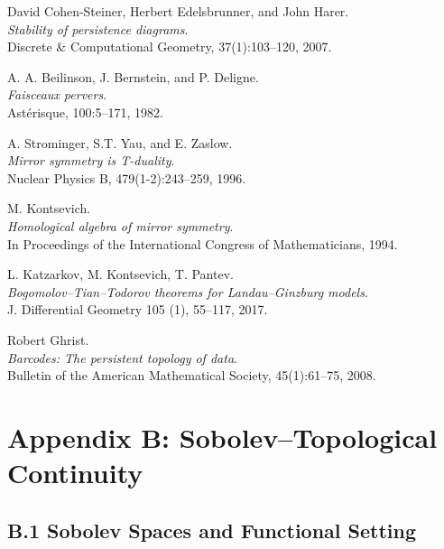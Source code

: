 \documentclass[11pt]{article}
\begin{document}
\begin{thebibliography}{9}

David Cohen-Steiner, Herbert Edelsbrunner, and John Harer.\\
\textit{Stability of persistence diagrams}.\\
Discrete \& Computational Geometry, 37(1):103--120, 2007.

A. A. Beilinson, J. Bernstein, and P. Deligne.\\
\textit{Faisceaux pervers}.\\
Ast\'erisque, 100:5–171, 1982.

A. Strominger, S.T. Yau, and E. Zaslow.\\
\textit{Mirror symmetry is T-duality}.\\
Nuclear Physics B, 479(1-2):243–259, 1996.

M. Kontsevich.\\
\textit{Homological algebra of mirror symmetry}.\\
In Proceedings of the International Congress of Mathematicians, 1994.

L. Katzarkov, M. Kontsevich, T. Pantev.\\
\textit{Bogomolov–Tian–Todorov theorems for Landau–Ginzburg models}.\\
J. Differential Geometry 105 (1), 55–117, 2017.

Robert Ghrist.\\
\textit{Barcodes: The persistent topology of data}.\\
Bulletin of the American Mathematical Society, 45(1):61--75, 2008.

\end{thebibliography}




\section*{Appendix B: Sobolev–Topological Continuity}



\subsection*{B.1 Sobolev Spaces and Functional Setting}
\end{document}
